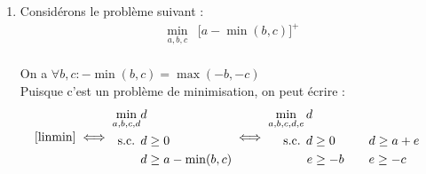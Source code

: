 \documentclass[a4paper,12pt]{article}
\begin{document}
\begin {enumerate}
{    On introduit la variable continue $\delta$ et les contraintes suivantes :
    $$ \delta \geq \alpha, \qquad \delta \geq \beta $$
    Le problème initial s'écrit alors :
    \begin{equation}
        \begin{aligned}
            \min _{\alpha, \beta, \gamma, \delta}  \delta &+ \gamma \\
            \text{ s.c. }  A(\alpha, \beta, \gamma)^T &\leq b \\
            \alpha &\leq \delta \\
            \beta &\leq \delta \\
        \end{aligned}
    \end{equation}
}

\item{
    Considérons le problème suivant :
    \begin{equation}
        \begin{aligned}
            \min _{a, b, c} & \lbrack a - \min(b, c) \rbrack^+ \\
        \end{aligned}
        \label{linmin}
    \end{equation}

    On a $ \forall b, c : -\min(b, c) = \max(-b, -c) $ \\
    Puisque c'est un problème de minimisation, on peut écrire :
    \begin{equation}
        \eqref{linmin} \iff
        \begin{aligned}
            \min _{a, b, c, d} & d \\
            \text{ s.c. } & d \geq 0 \\
            & d \geq a - \min(b, c) \\
        \end{aligned}
        \iff
        \begin{aligned}
            \min _{a, b, c, d, e} d \\
            \text{ s.c. }
            d &\geq 0 & \quad& d \geq a + e \\
            e &\geq -b & \quad& e \geq -c \\   
        \end{aligned}
    \end{equation}
    

}
\end{enumerate}
\end{document}
